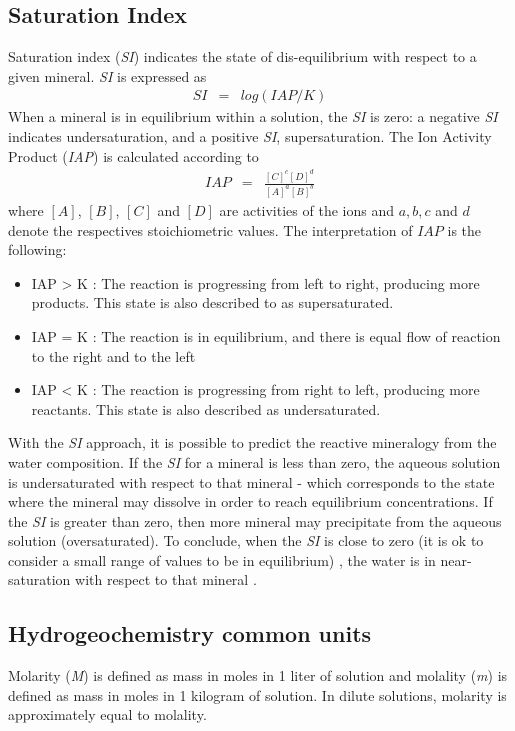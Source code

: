 \subsection{Saturation Index}
Saturation index (\emph{SI}) indicates the state of dis-equilibrium with respect to a given mineral. \emph{SI} is expressed as
\begin{eqnarray} \label{eq:siEq}
SI &=& log (IAP / K )
\end{eqnarray}
When a mineral is in equilibrium within a solution, the \emph{SI} is zero: a negative \emph{SI} indicates undersaturation, and a positive \emph{SI}, supersaturation. 
The Ion Activity Product (\emph{IAP}) is calculated according to
\begin{eqnarray}
IAP &=& \frac{[C]^c [D]^d}{[A]^a[B]^b}
\end{eqnarray}
where $[A]$, $[B]$, $[C]$ and $[D]$ are activities of the ions and $a, b, c$ and $d$ denote the respectives stoichiometric values. The interpretation of $IAP$ is the following:
\begin{itemize}
\item IAP > K : The reaction is progressing from left to right, producing more products. This state is also described to as supersaturated.
\item IAP = K : The reaction is in equilibrium, and there is equal flow of reaction to the right and to the left
\item IAP < K : The reaction is progressing from right to left, producing more reactants. This state is also described as undersaturated.
\end{itemize}

With the \emph{SI} approach, it is possible to predict the reactive mineralogy from the water composition. If the \emph{SI} for a mineral is less than zero, the aqueous solution is undersaturated with respect to that mineral - which corresponds to the state where the mineral may dissolve in order to reach equilibrium concentrations. If the \emph{SI} is greater than zero, then more mineral may precipitate from the aqueous solution (oversaturated). To conclude, when the \emph{SI} is close to zero (it is ok to consider a small range of values to be in equilibrium) , the water is in near- saturation  with respect to that mineral \cite{Alley:93}. 


\subsection{Hydrogeochemistry common units}
Molarity (\emph{M}) is defined as mass in moles in 1 liter of solution and molality (\emph{m}) is defined as mass in moles in 1 kilogram of solution. In dilute solutions, molarity is approximately equal to molality. 

